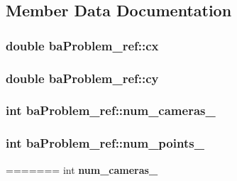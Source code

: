 \begin{DoxyCompactItemize}
\subsection{Member Data Documentation}
\hypertarget{classbaProblem__ref_a7f8a2c3626cbd11ac8aba36d8fb24558}{
\subsubsection[{cx}]{\setlength{\rightskip}{0pt plus 5cm}double ba\-Problem\-\_\-ref\-::cx}}\label{d2/d3f/classbaProblem__ref_a7f8a2c3626cbd11ac8aba36d8fb24558}
\hypertarget{classbaProblem__ref_a6dd08234b8f251edf79d66d2f800a905}{
\subsubsection[{cy}]{\setlength{\rightskip}{0pt plus 5cm}double ba\-Problem\-\_\-ref\-::cy}}\label{d2/d3f/classbaProblem__ref_a6dd08234b8f251edf79d66d2f800a905}
\hypertarget{classbaProblem__ref_aa66f29e12cd960cab710165a755f0b35}{
\subsubsection[{num\-\_\-cameras\-\_\-}]{\setlength{\rightskip}{0pt plus 5cm}int ba\-Problem\-\_\-ref\-::num\-\_\-cameras\-\_\-}}\label{d2/d3f/classbaProblem__ref_aa66f29e12cd960cab710165a755f0b35}
\hypertarget{classbaProblem__ref_a970268458224931ac624358248d1a7cc}{
\subsubsection[{num\-\_\-points\-\_\-}]{\setlength{\rightskip}{0pt plus 5cm}int ba\-Problem\-\_\-ref\-::num\-\_\-points\-\_\-}}\label{d2/d3f/classbaProblem__ref_a970268458224931ac624358248d1a7cc}
=======
\hypertarget{classbaProblem__ref_aa66f29e12cd960cab710165a755f0b35}{int {\bfseries num\-\_\-cameras\-\_\-}}\label{d2/d3f/classbaProblem__ref_aa66f29e12cd960cab710165a755f0b35}


\end{DoxyCompactItemize}
